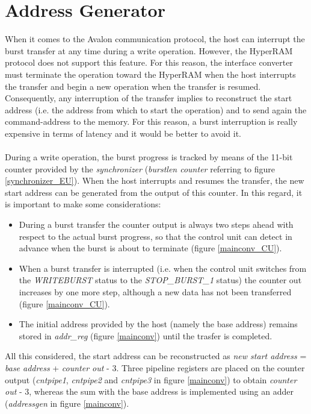 \documentclass[10pt, english, a4paper, titlepage, oneside]{book}
\begin{document}
\section{Address Generator} \label{Address Generator}
\vspace{2mm}
When it comes to the Avalon communication protocol, the host can interrupt the burst transfer at any time during a write operation. However, the HyperRAM protocol does not support this feature. For this reason, the interface converter must terminate the operation toward the HyperRAM when the host interrupts the transfer and begin a new operation when the transfer is resumed. Consequently, any interruption of the transfer implies to reconstruct the start address (i.e. the address from which to start the operation) and to send again the command-address to the memory. For this reason, a burst interruption is really expensive in terms of latency and it would be better to avoid it. \\ \\
During a write operation, the burst progress is tracked by means of the 11-bit counter provided by the \textit{synchronizer} (\textit{burstlen counter} referring to figure \ref{synchronizer_EU}). When the host interrupts and resumes the transfer, the new start address can be generated from the output of this counter. In this regard, it is important to make some considerations:
\begin{itemize}
\vspace{2mm}
    \item During a burst transfer the counter output is always two steps ahead with respect to the actual burst progress, so that the control unit can detect in advance when the burst is about to terminate (figure \ref{mainconv_CU}).
    \vspace{1mm}
    \item When a burst transfer is interrupted (i.e. when the control unit switches from the \textit{WRITEBURST} status to the \textit{STOP\_BURST\_1} status) the counter out increases by one more step, although a new data has not been transferred (figure \ref{mainconv_CU}).
    \vspace{1mm}
    \item The initial address provided by the host (namely the base address) remains stored in \textit{addr\_reg} (figure \ref{mainconv}) until the trasfer is completed.
\end{itemize}
\vspace{3mm}
All this considered, the start address can be reconstructed as \textit{new start address} = \textit{base address} + \textit{counter out} - 3. Three pipeline registers are placed on the counter output (\textit{cntpipe1}, \textit{cntpipe2} and \textit{cntpipe3} in figure \ref{mainconv}) to obtain \textit{counter out} - 3, whereas the sum with the base address is implemented using an adder (\textit{addressgen} in figure \ref{mainconv}).
\vspace{6mm}
\end{document}
